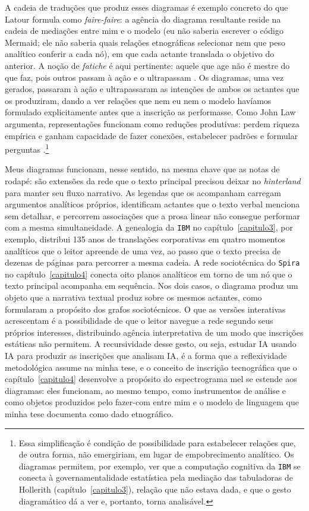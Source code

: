 A cadeia de traduções que produz esses diagramas é exemplo concreto do que Latour formula como \textit{faire-faire}: a agência do diagrama resultante reside na cadeia de mediações entre mim e o modelo (eu não saberia escrever o código Mermaid; ele não saberia quais relações etnográficas selecionar nem que peso analítico conferir a cada nó), em que cada actante translada o objetivo do anterior. A noção de \textit{fatiche} é aqui pertinente: aquele que age não é mestre do que faz, pois outros passam à ação e o ultrapassam \parencite{latour2010factish}. Os diagramas, uma vez gerados, passaram à ação e ultrapassaram as intenções de ambos os actantes que os produziram, dando a ver relações que nem eu nem o modelo havíamos formulado explicitamente antes que a inscrição as performasse. Como John Law argumenta, representações funcionam como reduções produtivas: perdem riqueza empírica e ganham capacidade de fazer conexões, estabelecer padrões e formular perguntas \parencite{Law2004After}.\footnote{Essa simplificação é condição de possibilidade para estabelecer relações que, de outra forma, não emergiriam, em lugar de empobrecimento analítico. Os diagramas permitem, por exemplo, ver que a computação cognitiva da \texttt{IBM} se conecta à governamentalidade estatística pela mediação das tabuladoras de Hollerith (capítulo~\ref{capitulo3}), relação que não estava dada, e que o gesto diagramático dá a ver e, portanto, torna analisável.}

Meus diagramas funcionam, nesse sentido, na mesma chave que as notas de rodapé: são extensões da rede que o texto principal precisou deixar no \textit{hinterland} para manter seu fluxo narrativo. As legendas que os acompanham carregam argumentos analíticos próprios, identificam actantes que o texto verbal menciona sem detalhar, e percorrem associações que a prosa linear não consegue performar com a mesma simultaneidade. A genealogia da \texttt{IBM} no capítulo~\ref{capitulo3}, por exemplo, distribui 135 anos de translações corporativas em quatro momentos analíticos que o leitor apreende de uma vez, ao passo que o texto precisa de dezenas de páginas para percorrer a mesma cadeia. A rede sociotécnica do \texttt{Spira} no capítulo~\ref{capitulo4} conecta oito planos analíticos em torno de um nó que o texto principal acompanha em sequência. Nos dois casos, o diagrama produz um objeto que a narrativa textual produz sobre os mesmos actantes, como \textcite{LatourMauguinTeil1992} formularam a propósito dos grafos sociotécnicos. O que as versões interativas acrescentam é a possibilidade de que o leitor navegue a rede segundo seus próprios interesses, distribuindo agência interpretativa de um modo que inscrições estáticas não permitem. A recursividade desse gesto, ou seja, estudar IA usando IA para produzir as inscrições que analisam IA, é a forma que a reflexividade metodológica assume na minha tese, e o conceito de inscrição tecnográfica que o capítulo~\ref{capitulo4} desenvolve a propósito do espectrograma mel se estende aos diagramas: eles funcionam, ao mesmo tempo, como instrumentos de análise e como objetos produzidos pelo fazer-com entre mim e o modelo de linguagem que minha tese documenta como dado etnográfico.

